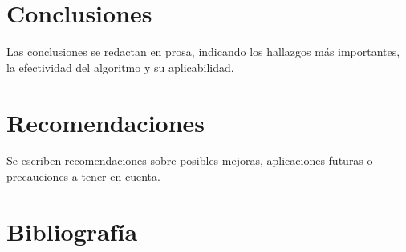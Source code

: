 \documentclass[conference]{IEEEtran}  %
\begin{document}
\section{Conclusiones}
Las conclusiones se redactan en prosa, indicando los hallazgos más importantes, la efectividad del algoritmo y su aplicabilidad.

\section{Recomendaciones}
Se escriben recomendaciones sobre posibles mejoras, aplicaciones futuras o precauciones a tener en cuenta.

\section*{Bibliografía}

\end{document}
